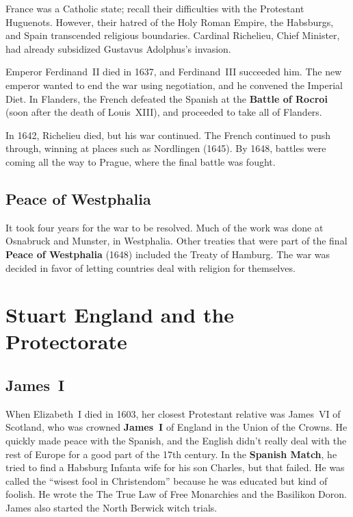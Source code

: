 France was a Catholic state; recall their difficulties with the Protestant Huguenots.
However, their hatred of the Holy Roman Empire, the Habsburgs, and Spain transcended religious boundaries.
Cardinal Richelieu, Chief Minister, had already subsidized Gustavus Adolphus's invasion.

Emperor Ferdinand~II died in 1637, and Ferdinand~III succeeded him.
The new emperor wanted to end the war using negotiation, and he convened the Imperial Diet.
In Flanders, the French defeated the Spanish at the \textbf{Battle of Rocroi}
(soon after the death of Louis~XIII), and proceeded to take all of Flanders.

In 1642, Richelieu died, but his war continued.
The French continued to push through, winning at places such as Nordlingen (1645).
By 1648, battles were coming all the way to Prague, where the final battle was fought.

\subsection*{Peace of Westphalia}

It took four years for the war to be resolved.
Much of the work was done at Osnabruck and Munster, in Westphalia.
Other treaties that were part of the final \textbf{Peace of Westphalia} (1648) included the Treaty of Hamburg.
The war was decided in favor of letting countries deal with religion for themselves.

\section{Stuart England and the Protectorate}

\subsection*{James~I}

When Elizabeth~I died in 1603, her closest Protestant relative was
James~VI of Scotland, who was crowned \textbf{James~I} of England in the Union of the Crowns.
He quickly made peace with the Spanish,
and the English didn't really deal with the rest of Europe for a good part of the 17th century.
In the \textbf{Spanish Match}, he tried to find a Habsburg Infanta wife for his son Charles, but that failed.
He was called the ``wisest fool in Christendom'' because he was educated but kind of foolish.
He wrote the The True Law of Free Monarchies and the Basilikon Doron.
James also started the North Berwick witch trials.

